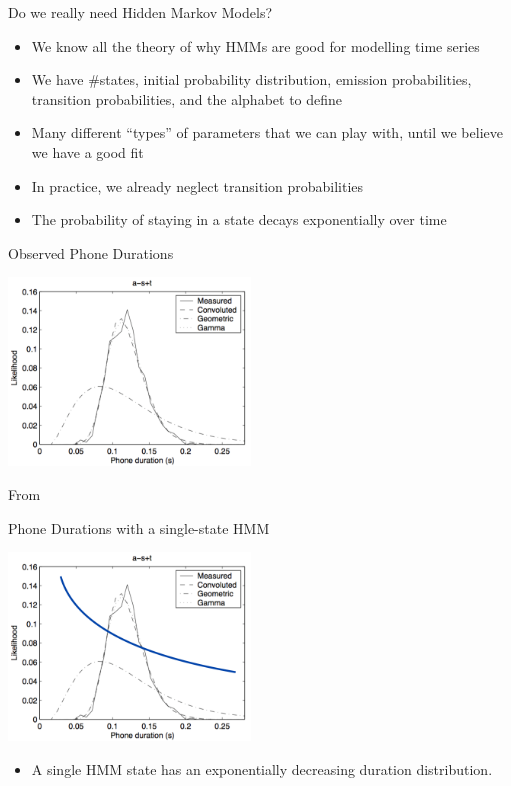 \begin{frame}{Do we really need Hidden Markov Models?}
  \begin{itemize}
  \item We know all the theory of why HMMs are good for modelling time series
  \item We have \#states, initial probability distribution, emission probabilities,
    transition probabilities, and the alphabet to define
  \item Many different ``types'' of parameters that we can play with, until we believe we have a good fit
  \item In practice, we already neglect transition probabilities
  \item The probability of staying in a state decays exponentially over time
  \end{itemize}
\end{frame}

\begin{frame}{Observed Phone Durations}
  \begin{center}
    \includegraphics[height=50mm]{figures/durations}
  \end{center}
  \tiny From \cite{Pylkkonen04durationmodeling}
\end{frame}

\begin{frame}{Phone Durations with a single-state HMM}
  \begin{center}
    \includegraphics[height=50mm]{figures/durations3}
  \end{center}
  \begin{itemize}
  \item A single HMM state has an exponentially decreasing duration distribution.
  \end{itemize}
\end{frame}

